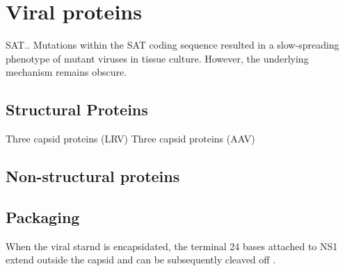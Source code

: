 \section{Viral proteins}


 

SAT..
Mutations within the SAT coding sequence resulted in a slow-spreading phenotype of mutant viruses in tissue culture. However, the underlying mechanism remains obscure. 


\subsection{Structural Proteins}

Three capsid proteins (LRV) \cite{pmid4321164}
Three capsid proteins (AAV) \cite{pmid5132697, pmid5172922}



\subsection{Non-structural proteins}
 
 \subsection{Packaging}
When the viral starnd is encapsidated, the terminal 24 bases attached to NS1 extend outside the capsid and can be subsequently cleaved off \cite{pmid2527311}.

\section{}


\subsection{}



\subsection{}

